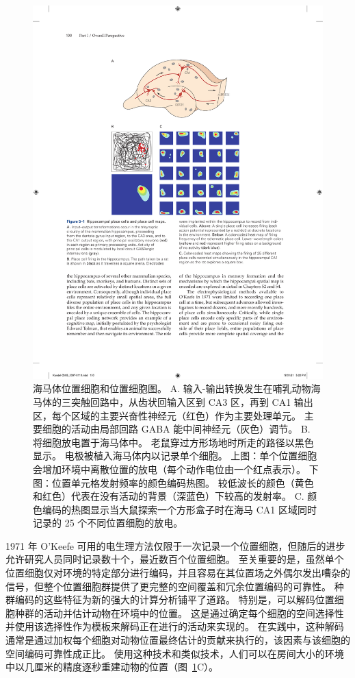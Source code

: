 \begin{figure}[htbp]
	\centering
	\includegraphics[width=1.0\linewidth]{chap05/fig_5_1}
	\caption{海马体位置细胞和位置细胞图。 
		A. 输入-输出转换发生在哺乳动物海马体的三突触回路中，从齿状回输入区到 CA3 区，再到 CA1 输出区，每个区域的主要兴奋性神经元（红色）作为主要处理单元。
		主要细胞的活动由局部回路 GABA 能中间神经元（灰色）调节。 
		B. 将细胞放电置于海马体中。 
		老鼠穿过方形场地时所走的路径以黑色显示。 
		电极被植入海马体内以记录单个细胞。 
		上图：单个位置细胞会增加环境中离散位置的放电（每个动作电位由一个红点表示）。
		下图：位置单元格发射频率的颜色编码热图。 
		较低波长的颜色（黄色和红色）代表在没有活动的背景（深蓝色）下较高的发射率。 
		C. 颜色编码的热图显示当大鼠探索一个方形盒子时在海马 CA1 区域同时记录的 25 个不同位置细胞的放电。}
	\label{fig:5_1}
\end{figure}


1971 年 O’Keefe 可用的电生理方法仅限于一次记录一个位置细胞，但随后的进步允许研究人员同时记录数十个，最近数百个位置细胞。
至关重要的是，虽然单个位置细胞仅对环境的特定部分进行编码，并且容易在其位置场之外偶尔发出嘈杂的信号，但整个位置细胞群提供了更完整的空间覆盖和冗余位置编码的可靠性。
种群编码的这些特征为新的强大的计算分析铺平了道路。 
特别是，可以解码位置细胞种群的活动并估计动物在环境中的位置。
这是通过确定每个细胞的空间选择性并使用该选择性作为模板来解码正在进行的活动来实现的。
在实践中，这种解码通常是通过加权每个细胞对动物位置最终估计的贡献来执行的，该因素与该细胞的空间编码可靠性成正比。
使用这种技术和类似技术，人们可以在房间大小的环境中以几厘米的精度逐秒重建动物的位置（图~\ref{fig:5_1}C）。



